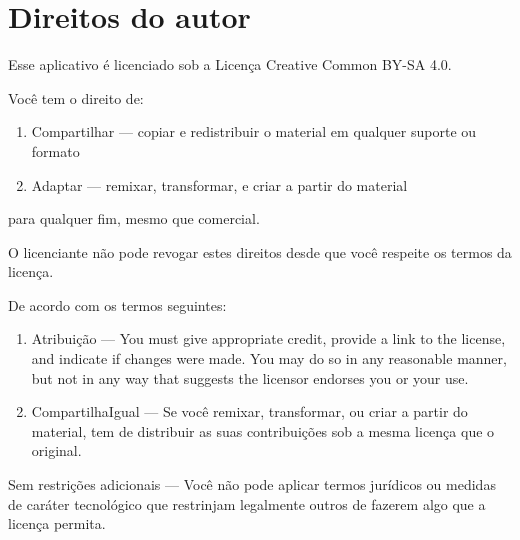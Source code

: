 \section*{Direitos do autor}

Esse aplicativo é licenciado sob a Licença Creative Common BY-SA 4.0.

Você tem o direito de:
\begin{enumerate}
\item  Compartilhar — copiar e redistribuir o material em qualquer suporte ou
  formato
\item Adaptar — remixar, transformar, e criar a partir do material
\end{enumerate}
para qualquer fim, mesmo que comercial.

O licenciante não pode revogar estes direitos desde que você respeite os termos
da licença.

De acordo com os termos seguintes:
\begin{enumerate}
\item Atribuição — You must give appropriate credit, provide a link to the license, and indicate if changes were made. You may do so in any reasonable manner, but not in any way that suggests the licensor endorses you or your use.
\item CompartilhaIgual — Se você remixar, transformar, ou criar a partir do material, tem de distribuir as suas contribuições sob a mesma licença que o original.
\end{enumerate}
Sem restrições adicionais — Você não pode aplicar termos jurídicos ou medidas
de caráter tecnológico que restrinjam legalmente outros de fazerem algo que a
licença permita.
